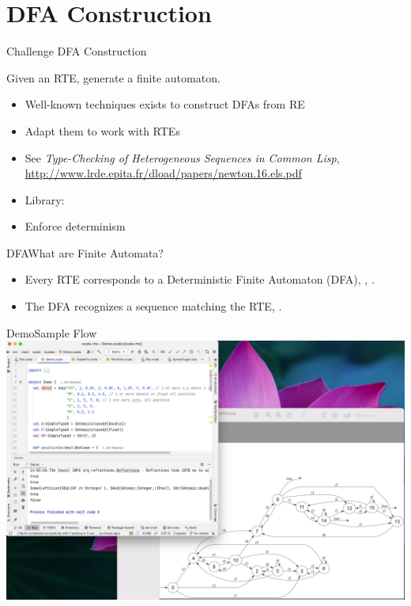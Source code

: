 \section{DFA Construction}

{  
\begin{frame}{Challenge }{DFA Construction}

  Given an RTE, generate a finite automaton.

  \begin{itemize}
  \item Well-known techniques exists to construct DFAs from RE
  \item Adapt them to work with RTEs
  \item See \emph{Type-Checking of Heterogeneous Sequences in Common Lisp},
    \url{http://www.lrde.epita.fr/dload/papers/newton.16.els.pdf}
  \item Library: 
  \item Enforce determinism
  \end{itemize}
\end{frame}

}

\begin{frame}{DFA}{What are Finite Automata?}
  \scalebox{0.75}{}
  \begin{itemize}
  \item   Every RTE corresponds to a Deterministic Finite Automaton (DFA), , .

  \item   The DFA recognizes a sequence matching the RTE, .

  \end{itemize}
\end{frame}



\begin{frame}{Demo}{Sample Flow}
  \centering
   \includegraphics[height=0.8\textheight]{demo.png}
\end{frame}


